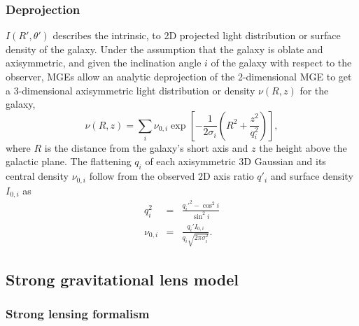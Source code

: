 \documentclass[useAMS,usenatbib]{mnras}
\begin{document}
\subsubsection{Deprojection} \label{sec:MGE_theo_deprojection}

$I(R',\theta')$ describes the intrinsic, to 2D projected light distribution or surface density of the galaxy. Under the assumption that the galaxy is oblate and axisymmetric, and given the inclination angle $i$ of the galaxy with respect to the observer, MGEs allow an analytic deprojection of the 2-dimensional MGE to get a 3-dimensional axisymmetric light distribution or density $\nu(R,z)$ for the galaxy,
\begin{equation}
\nu(R,z) = \sum_i \nu_{0,i} \exp \left[-\frac{1}{2\sigma_i}\left(R^2 + \frac{z^2}{q_i^2} \right) \right], \label{eq:deprojMGE}
\end{equation}
where $R$ is the distance from the galaxy's short axis and $z$ the height above the galactic plane. The flattening $q_i$ of each axisymmetric 3D Gaussian and its central density $\nu_{0,i}$ follow from the observed 2D axis ratio $q'_i$ and surface density $I_{0,i}$ as
\begin{eqnarray*}
q_i^2 &=& \frac{q_i'^2 - \cos^2 i}{\sin^2 i}\\
\nu_{0,i} &=& \frac{q_i' I_{0,i}}{q_i \sqrt{2 \pi \sigma_i^2}}.
\end{eqnarray*}

\subsection{Strong gravitational lens model} \label{sec:lensing_theo}

\subsubsection{Strong lensing formalism}
\end{document}
